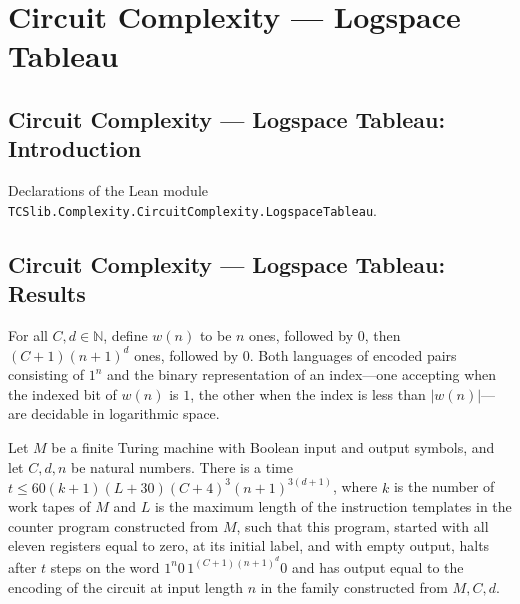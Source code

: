 \section{Circuit Complexity --- Logspace Tableau}
\subsection*{Circuit Complexity --- Logspace Tableau: Introduction}

Declarations of the Lean module \texttt{TCSlib.Complexity.CircuitComplexity.LogspaceTableau}.

\subsection*{Circuit Complexity --- Logspace Tableau: Results}

\begin{theorem}
\label{Complexity.unaryLogspace_frontWord}
\leanok
{}
For all $C,d\in\mathbb N$, define $w(n)$ to be $n$ ones, followed by $0$, then
$(C+1)(n+1)^d$ ones, followed by $0$. Both languages of encoded pairs consisting of
$1^n$ and the binary representation of an index—one accepting when the indexed bit of
$w(n)$ is $1$, the other when the index is less than $|w(n)|$—are decidable in
logarithmic space.
\end{theorem}

\begin{theorem}
\label{Complexity.emit_run}
\leanok
{}
Let $M$ be a finite Turing machine with Boolean input and output symbols, and let
$C,d,n$ be natural numbers. There is a time $t \le 60(k+1)(L+30)(C+4)^3(n+1)^{3(d+1)}$,
where $k$ is the number of work tapes of $M$ and $L$ is the maximum length of the
instruction templates in the counter program constructed from $M$, such that this
program, started with all eleven registers equal to zero, at its initial label, and with
empty output, halts after $t$ steps on the word $1^n0\,1^{(C+1)(n+1)^d}0$ and has output
equal to the encoding of the circuit at input length $n$ in the family constructed from
$M,C,d$.
\end{theorem}

